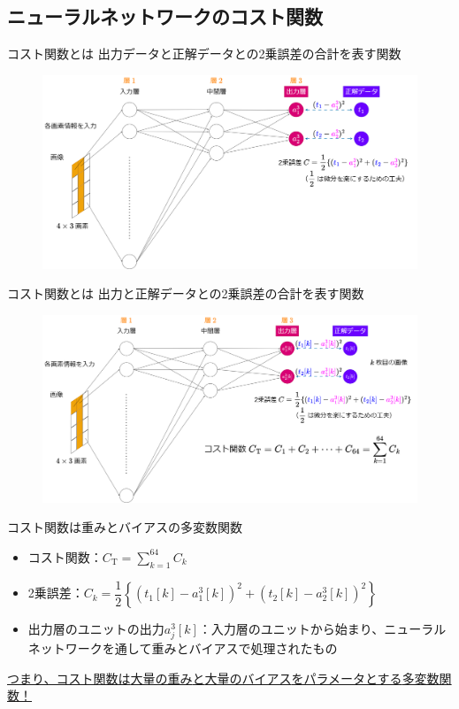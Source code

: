 \documentclass[dvipdfmx,aspectratio=169]{beamer}
\begin{document}
	\subsection{ニューラルネットワークのコスト関数}
	\begin{frame}{コスト関数とは}
		出力データと正解データとの2乗誤差の合計を表す関数
		\begin{figure}
			\centering
			\includegraphics[width=0.75\linewidth]{img/illustration-of-squared-error}
		\end{figure}
	\end{frame}
	\begin{frame}{コスト関数とは}
		出力と正解データとの2乗誤差の合計を表す関数
		\begin{figure}
			\centering
			\includegraphics[width=0.75\linewidth]{img/illustration-of-the-cost-function}
		\end{figure}
	\end{frame}
	\begin{frame}{コスト関数は重みとバイアスの多変数関数}
		\begin{itemize}
			\item コスト関数：$C_\mathrm{T} = \displaystyle\sum_{k=1}^{64} C_k $
			\item 2乗誤差：$ C_k = \dfrac{1}{2}\left\{(t_1[k] - a^3_1[k])^2 + (t_2[k] - a^3_2[k])^2\right\} $
			\item 出力層のユニットの出力$ a^3_j[k] $：入力層のユニットから始まり、ニューラルネットワークを通して重みとバイアスで処理されたもの
		\end{itemize}
		\underline{つまり、コスト関数は\alert{大量の重み}と\alert{大量のバイアス}をパラメータとする\alert{多変数関数}！}
	\end{frame}
\end{document}
